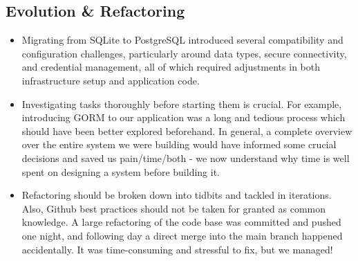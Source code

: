 
\subsection{Evolution \& Refactoring}
\begin{itemize} 
    \item Migrating from SQLite to PostgreSQL introduced several compatibility and configuration challenges, particularly around data types, secure connectivity, and credential management, all of which required adjustments in both infrastructure setup and application code.
    \item Investigating tasks thoroughly before starting them is crucial. For example, introducing GORM to our application was a long and tedious process which should have been better explored beforehand. In general, a complete overview over the entire system we were building would have informed some crucial decisions and saved us pain/time/both - we now understand why time is well spent on designing a system before building it.
    \item Refactoring should be broken down into tidbits and tackled in iterations. Also, Github best practices should not be taken for granted as common knowledge. A large refactoring of the code base was committed and pushed one night, and following day a direct merge into the main branch happened accidentally. It was time-consuming and stressful to fix, but we managed!  
\end{itemize}

